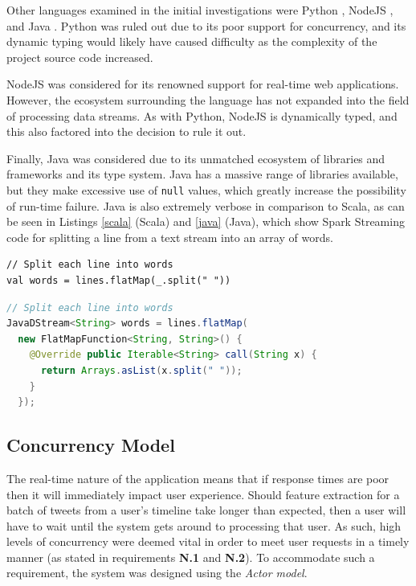 \documentclass{l4proj}
\newcommand{\code}[1]{\texttt{#1}}
\begin{document}
        Other languages examined in the initial investigations were Python \cite{python}, NodeJS \cite{node}, and Java \cite{java}. Python was ruled out due to its poor support for concurrency, and its dynamic typing would likely have caused difficulty as the complexity of the project source code increased. 
        
        NodeJS was considered for its renowned support for real-time web applications. However, the ecosystem surrounding the language has not expanded into the field of processing data streams. As with Python, NodeJS is dynamically typed, and this also factored into the decision to rule it out. 
        
        Finally, Java was considered due to its unmatched ecosystem of libraries and frameworks and its type system. Java has a massive range of libraries available, but they make excessive use of \code{null} values, which greatly increase the possibility of run-time failure. Java is also extremely verbose in comparison to Scala, as can be seen in Listings \ref{scala} (Scala) and \ref{java} (Java), which show Spark Streaming code for splitting a line from a text stream into an array of words.

\begin{lstlisting}[caption=Scala example of splitting a line in Spark Streaming.,label=scala]
// Split each line into words
val words = lines.flatMap(_.split(" "))
\end{lstlisting}

\begin{lstlisting}[language=Java,caption=Java example of splitting a line in Spark Streaming,label=java]
// Split each line into words
JavaDStream<String> words = lines.flatMap(
  new FlatMapFunction<String, String>() {
    @Override public Iterable<String> call(String x) {
      return Arrays.asList(x.split(" "));
    }
  });
\end{lstlisting}




    \subsection{Concurrency Model}
    
    The real-time nature of the application means that if response times are poor then it will immediately impact user experience. Should feature extraction for a batch of tweets from a user's timeline take longer than expected, then a user will have to wait until the system gets around to processing that user. As such, high levels of concurrency were deemed vital in order to meet user requests in a timely manner (as stated in requirements \textbf{N.1} and \textbf{N.2}). To accommodate such a requirement, the system was designed using the \textit{Actor model}.
    
\end{document}

